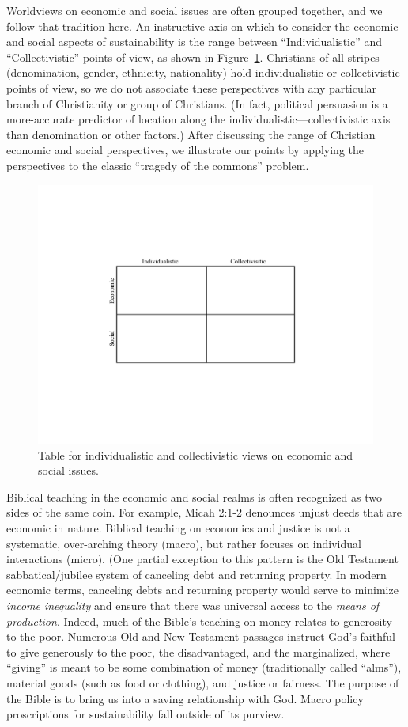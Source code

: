 \documentclass[12pt]{article}
\newcommand{\ins}[1]{\textcolor{red}{#1}}
\begin{document}
Worldviews on economic and social issues are often grouped together, and
we follow that tradition here. 
An instructive axis on which to consider the economic and social aspects of sustainability
is the range between ``Individualistic'' and ``Collectivistic'' points of view, 
as shown in Figure~\ref{fig:table}.
Christians of all stripes (denomination, gender, ethnicity, nationality)
hold individualistic or collectivistic points of view, 
so we do not associate these perspectives with any particular branch of Christianity
or group of Christians.
(In fact, political persuasion is a more-accurate predictor of location along the 
individualistic---collectivistic axis than denomination or other factors.)
After discussing the range of Christian economic and social perspectives,
we illustrate our points by applying the perspectives to the 
classic ``tragedy of the commons'' problem. 

\begin{figure}
\centering
\includegraphics[width=0.75\linewidth]{figure_other/QuadTable}
\caption{Table for individualistic and collectivistic views on economic and social issues.}
\label{fig:table}
\end{figure}

Biblical teaching in the economic and social realms is often recognized 
as two sides of the same coin. 
For example, Micah 2:1-2 denounces unjust deeds that are economic in nature. 
Biblical teaching on economics and justice is not a
systematic, over-arching theory (macro),
but rather focuses on individual interactions (micro).
(One partial exception to this pattern is the Old Testament sabbatical/jubilee system 
of canceling debt and returning property.
In modern economic terms, canceling debts and returning property would serve to minimize 
\emph{income inequality} and ensure that there was universal access to the \emph{means of production}.
Indeed, much of the Bible's
teaching on money relates to generosity to the poor. 
Numerous Old and New Testament passages instruct God's faithful to
give generously to the poor, the disadvantaged, and the marginalized, 
where ``giving'' is meant to be some combination of 
money (traditionally called ``alms''), 
material goods (such as food or clothing), and 
justice or fairness.
The purpose of the Bible is to bring us into a saving relationship with God.
Macro policy proscriptions for sustainability fall outside of its purview.
\end{document}
